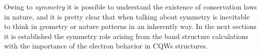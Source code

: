 Owing to \emph{symmetry} it is possible to understand the existence of conservation laws in nature, and it is pretty clear that when talking about symmetry is inevitable to think in geometry or nature patterns in an inherently
way. In the next sections it is  established the symmetry role arising from the band structure
calculations with the importance of the electron behavior in \gls{CQWs} structures.

